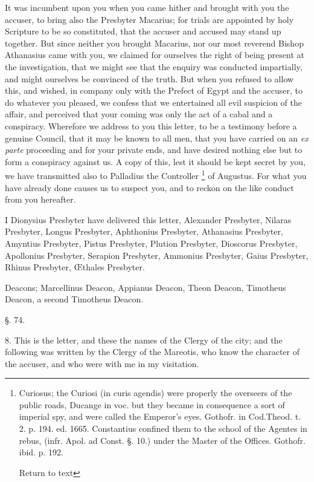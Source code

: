 It was incumbent upon you when you came hither
and brought with you the accuser, to bring also the Presbyter Macarius;
for trials are appointed by holy Scripture to be so constituted, that
the accuser and accused may stand up together. But since neither you
brought Macarius, nor our most reverend Bishop Athanasius came with
you, we claimed for ourselves the right of being present at the
investigation, that we might see that the enquiry was conducted
impartially, and might ourselves be convinced of the truth. But when
you refused to allow this, and wished, in company only with the
Prefect of Egypt and the accuser, to do whatever you pleased, we
confess that we entertained all evil suspicion of the affair, and
perceived that your coming was only the act of a cabal and a
conspiracy. Wherefore we address to you this letter, to be a testimony
before a genuine Council, that it may be known to all men, that you
have carried on an \emph{ex parte} proceeding and for your private
ends, and have desired nothing else but to form a conspiracy against
us. A copy of this, lest it should be kept secret by you, we have
transmitted also to Palladius the Controller \footnote{Curiosus; the Curiosi (in curis agendis) were
properly the overseers of the public roads, Ducange in voc. but they
became in consequence a sort of imperial spy, and were called the
Emperor's eyes. Gothofr. in Cod.Theod. t. 2. p. 194. ed. 1665.
Constantius confined them to the school of the Agentes in rebus, (infr.
Apol. ad Const. §. 10.) under the Master of the Offices. Gothofr.
ibid. p. 192.

Return to text} of Augustus. For what you have already done causes us to
suspect you, and to reckon on the like conduct from you hereafter.

I Dionysius Presbyter have delivered this letter,
Alexander Presbyter, Nilaras Presbyter, Longus Presbyter, Aphthonius
Presbyter, Athanasius Presbyter, Amyntius Presbyter, Pistus Presbyter,
Plution Presbyter, Dioscorus Presbyter, Apollonius Presbyter, Serapion
Presbyter, Ammonius Presbyter, Gaius Presbyter, Rhinus Presbyter, Œthales
Presbyter.

Deacons; Marcellinus Deacon, Appianus Deacon,
Theon Deacon, Timotheus Deacon, a second Timotheus Deacon.

§. 74.

8. This is the letter, and these the names of the
Clergy of the city; and the following was written by the Clergy of the
Mareotis, who know the character of the accuser, and who were with me
in my visitation.

